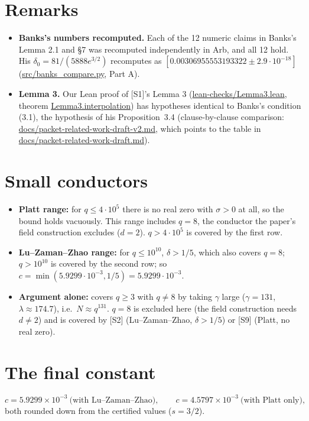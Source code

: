 \documentclass[11pt]{article}
\begin{document}
\section{Remarks}

\begin{itemize}
\item \textbf{Banks's numbers recomputed.} Each of the 12 numeric claims in Banks's Lemma 2.1 and \S7 was recomputed independently in Arb, and all 12 hold. His $\delta_0 = 81/(5888e^{3/2})$ recomputes as $[0.00306955553193322 \pm 2.9\cdot10^{-18}]$ (\url{src/banks_compare.py}, Part A).
\item \textbf{Lemma 3.} Our Lean proof of [S1]'s Lemma 3 (\url{lean-checks/Lemma3.lean}, theorem \url{Lemma3.interpolation}) has hypotheses identical to Banks's condition (3.1), the hypothesis of his Proposition~3.4 (clause-by-clause comparison: \url{docs/packet-related-work-draft-v2.md}, which points to the table in \url{docs/packet-related-work-draft.md}).
\end{itemize}

\section{Small conductors}

\begin{itemize}
\item \textbf{Platt range:} for $q\le 4\cdot10^5$ there is no real zero with $\sigma>0$ at all, so the bound holds vacuously. This range includes $q=8$, the conductor the paper's field construction excludes ($d=2$). $q>4\cdot10^5$ is covered by the first row.
\item \textbf{Lu--Zaman--Zhao range:} for $q\le10^{10}$, $\delta>1/5$, which also covers $q=8$; $q>10^{10}$ is covered by the second row; so $c=\min(5.9299\cdot10^{-3},1/5)=5.9299\cdot10^{-3}$.
\item \textbf{Argument alone:} covers $q\ge3$ with $q\ne8$ by taking $\gamma$ large ($\gamma=131$, $\lambda\approx174.7$), i.e.\ $N\approx q^{131}$. $q=8$ is excluded here (the field construction needs $d\ne2$) and is covered by [S2] (Lu--Zaman--Zhao, $\delta>1/5$) or [S9] (Platt, no real zero).
\end{itemize}

\section{The final constant}

\[
c = 5.9299\times10^{-3}\ \text{(with Lu--Zaman--Zhao)},\qquad c = 4.5797\times10^{-3}\ \text{(with Platt only)},
\]
both rounded down from the certified values ($s=3/2$).
\end{document}
